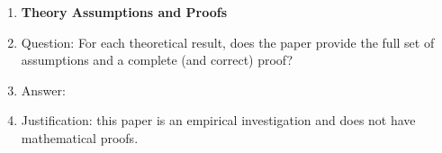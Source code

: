 \begin{enumerate}
\item {\bf Theory Assumptions and Proofs}
    \item[] Question: For each theoretical result, does the paper provide the full set of assumptions and a complete (and correct) proof?
    \item[] Answer: \answerNo{} %
    \item[] Justification: this paper is an empirical investigation and does not have mathematical proofs. 


\end{enumerate}
